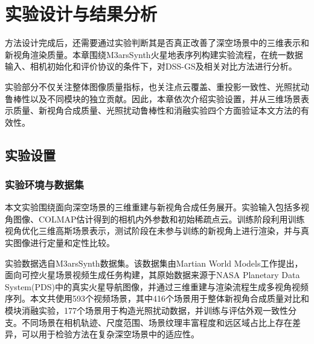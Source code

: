 
\chapter{实验设计与结果分析}

方法设计完成后，还需要通过实验判断其是否真正改善了深空场景中的三维表示和新视角渲染质量。本章围绕M3arsSynth火星地表序列构建实验流程，在统一数据输入、相机初始化和评价协议的条件下，对DSS-GS及相关对比方法进行分析。

实验部分不仅关注整体图像质量指标，也关注点云覆盖、重投影一致性、光照扰动鲁棒性以及不同模块的独立贡献。因此，本章依次介绍实验设置，并从三维场景表示质量、新视角合成质量、光照扰动鲁棒性和消融实验四个方面验证本文方法的有效性。

\section{实验设置}
\subsection{实验环境与数据集}
本文实验围绕面向深空场景的三维重建与新视角合成任务展开。实验输入包括多视角图像、COLMAP估计得到的相机内外参数和初始稀疏点云。训练阶段利用训练视角优化三维高斯场景表示，测试阶段在未参与训练的新视角上进行渲染，并与真实图像进行定量和定性比较。

实验数据选自M3arsSynth数据集。该数据集由Martian World Models工作提出，面向可控火星场景视频生成任务构建，其原始数据来源于NASA Planetary Data System(PDS)中的真实火星导航图像，并通过三维重建与渲染流程生成多视角视频序列。本文共使用593个视频场景，其中416个场景用于整体新视角合成质量对比和模块消融实验，177个场景用于构造光照扰动数据，并训练与评估外观一致性分支。不同场景在相机轨迹、尺度范围、场景纹理丰富程度和远区域占比上存在差异，可以用于检验方法在复杂深空场景中的适应性。

